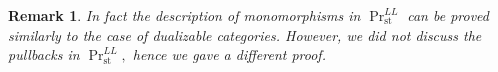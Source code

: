 \documentclass[11pt,leqno]{amsart}
\newtheorem{prop}[theo]{Proposition}
\newtheorem{remark}[theo]{Remark}
\numberwithin{equation}{section}
\newcommand{\indlim}[1][]{\mathop{\varinjlim}\limits_{#1}}
\newcommand{\xto}{\xrightarrow}
\newcommand{\Cat}{\operatorname{Cat}}
\newcommand{\Cofib}{\operatorname{Cofib}}
\newcommand{\st}{\operatorname{st}}
\newcommand{\Prr}{\operatorname{Pr}}
\newcommand{\cA}{{\mathcal A}}
\newcommand{\cB}{{\mathcal B}}
\newcommand{\cC}{{\mathcal C}}
\newcommand{\perf}{\operatorname{perf}}
\newcommand{\Sp}{\operatorname{Sp}}
\newcommand{\Ind}{\operatorname{Ind}}
\begin{document}
\begin{remark}In fact the description of monomorphisms in $\Pr^{LL}_{\st}$ can be proved similarly to the case of dualizable categories. However, we did not discuss the pullbacks in $\Pr^{LL}_{\st},$ hence we gave a different proof.\end{remark}






\end{document}
